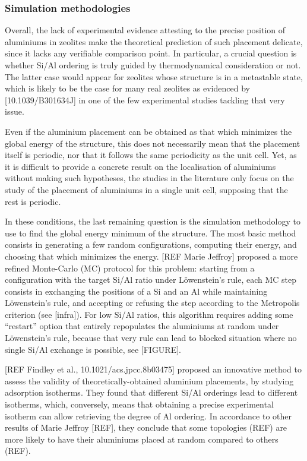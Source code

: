 \documentclass[main.tex]{subfiles}
\begin{document}
\subsubsection{Simulation methodologies}

Overall, the lack of experimental evidence attesting to the precise position of aluminiums in zeolites make the theoretical prediction of such placement delicate, since it lacks any verifiable comparison point. In particular, a crucial question is whether Si/Al ordering is truly guided by thermodynamical consideration or not. The latter case would appear for zeolites whose structure is in a metastable state, which is likely to be the case for many real zeolites as evidenced by [10.1039/B301634J] in one of the few experimental studies tackling that very issue.

Even if the aluminium placement can be obtained as that which minimizes the global energy of the structure, this does not necessarily mean that the placement itself is periodic, nor that it follows the same periodicity as the unit cell. Yet, as it is difficult to provide a concrete result on the localisation of aluminiums without making such hypotheses, the studies in the literature only focus on the study of the placement of aluminiums in a single unit cell, supposing that the rest is periodic.

In these conditions, the last remaining question is the simulation methodology to use to find the global energy minimum of the structure. The most basic method consists in generating a few random configurations, computing their energy, and choosing that which minimizes the energy. [REF Marie Jeffroy]\label{mariejeffroy_al} proposed a more refined Monte-Carlo (MC) protocol for this problem: starting from a configuration with the target Si/Al ratio under L\"owenstein's rule, each MC step consists in exchanging the positions of a Si and an Al while maintaining L\"owenstein's rule, and accepting or refusing the step according to the Metropolis criterion (see [infra]). For low Si/Al ratios, this algorithm requires adding some ``restart'' option that entirely repopulates the aluminiums at random under L\"owenstein's rule, because that very rule can lead to blocked situation where no single Si/Al exchange is possible, see [FIGURE].

[REF Findley et al., 10.1021/acs.jpcc.8b03475] proposed an innovative method to assess the validity of theoretically-obtained aluminium placements, by studying  adsorption isotherms. They found that different Si/Al orderings lead to different isotherms, which, conversely, means that obtaining a precise experimental isotherm can allow retrieving the degree of Al ordering. In accordance to other results of Marie Jeffroy [REF], they conclude that some topologies (REF) are more likely to have their aluminiums placed at random compared to others (REF).
\end{document}

